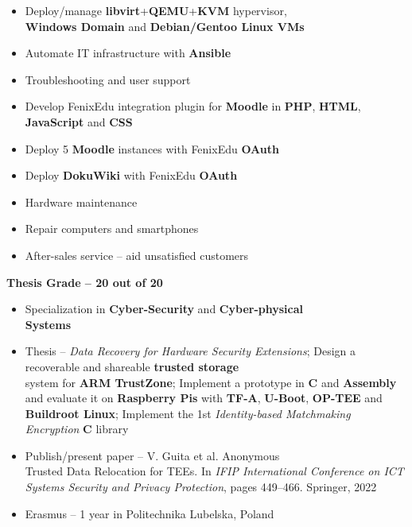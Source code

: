 \documentclass[10pt,a4paper,ragged2e,withhyper]{altacv}
\begin{document}
\begin{paracol}{2}
\begin{itemize}
\item Deploy/manage \textbf{libvirt}+\textbf{QEMU}+\textbf{KVM} hypervisor, \\ \textbf{Windows Domain} and \textbf{Debian/Gentoo Linux VMs}
\item Automate IT infrastructure with \textbf{Ansible}
\item Troubleshooting and user support
\item Develop FenixEdu integration plugin for \textbf{Moodle} in \textbf{PHP}, \textbf{HTML}, \textbf{JavaScript} and \textbf{CSS}
\item Deploy 5 \textbf{Moodle} instances with FenixEdu \textbf{OAuth}
\item Deploy \textbf{DokuWiki} with FenixEdu \textbf{OAuth}
\item Hardware maintenance
\end{itemize}
\divider

\begin{itemize}
\item Repair computers and smartphones
\item After-sales service -- aid unsatisfied customers
\end{itemize}

\medskip


\faGraduationCap \hspace{0.05cm} \textbf{Thesis Grade -- 20 out of 20}
\begin{itemize}
\item Specialization in \textbf{Cyber-Security} and \textbf{Cyber-physical\\ Systems}
\item Thesis -- \emph{Data Recovery for Hardware Security Extensions}; Design a recoverable and shareable \textbf{trusted storage} \\ system for \textbf{ARM TrustZone};
Implement a prototype in \textbf{C} and \textbf{Assembly} and evaluate it on \textbf{Raspberry Pis} with \textbf{TF-A}, \textbf{U-Boot}, \textbf{OP-TEE} and \textbf{Buildroot Linux};
Implement the 1st \emph{Identity-based Matchmaking Encryption} \textbf{C} library
\item Publish/present paper -- V. Guita et al. Anonymous\\ Trusted Data Relocation for TEEs. In \emph{IFIP International Conference on ICT Systems Security and Privacy Protection}, pages 449–466. Springer, 2022
\item Erasmus -- 1 year in Politechnika Lubelska, Poland
\end{itemize}


\end{paracol}
\end{document}
